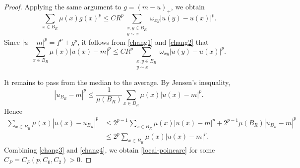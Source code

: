 \documentclass[10pt,a4paper]{amsart}
\begin{document}
\begin{proof}
Applying the same argument to \(g=(m-u)_+\), we obtain
\begin{equation}\label{chang2}
\sum_{x\in B_R}\mu(x)g(x)^p
\le
C R^p
\sum_{\substack{x,y\in B_R\\ y\sim x}}
\omega_{xy}|u(y)-u(x)|^p.
\end{equation}
Since \(|u-m|^p=f^p+g^p\), it follows from \eqref{chang1} and \eqref{chang2} that
\begin{equation}\label{chang3}
\sum_{x\in B_R}\mu(x)|u(x)-m|^p
\le
C R^p
\sum_{\substack{x,y\in B_R\\ y\sim x}}
\omega_{xy}|u(y)-u(x)|^p.
\end{equation}

It remains to pass from the median to the average. By Jensen's inequality,
\[
|u_{B_R}-m|^p
\le
\frac{1}{\mu(B_R)}
\sum_{x\in B_R}\mu(x)|u(x)-m|^p.
\]
Hence
\begin{equation}\label{chang4}
\begin{aligned}
\sum_{x\in B_R}\mu(x)|u(x)-u_{B_R}|^p
&\le
2^{p-1}\sum_{x\in B_R}\mu(x)|u(x)-m|^p
+
2^{p-1}\mu(B_R)|u_{B_R}-m|^p  \\
&\le
2^p
\sum_{x\in B_R}\mu(x)|u(x)-m|^p.
\end{aligned}
\end{equation}
Combining \eqref{chang3} and \eqref{chang4}, we
obtain \eqref{local-poincare} for some \(C_P=C_P(p,C_0,C_2)>0\).
\end{proof}
\end{document}
